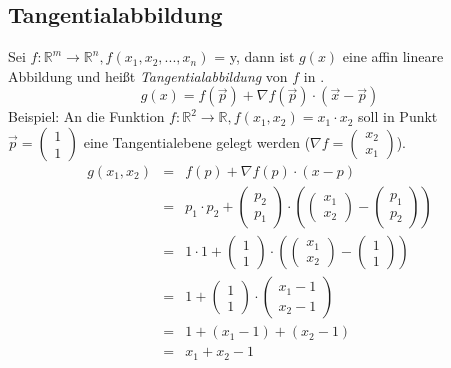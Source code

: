 \subsection{Tangentialabbildung} %
\label{sub:tangentialabbildung}
Sei $f : \mathbb{R}^m \rightarrow \mathbb{R}^n, f(x_1,x_2,...,x_n)$ = y, dann ist $g(x)$ eine affin lineare Abbildung und heißt
\emph{Tangentialabbildung} von $f$ in .
\begin{equation}
	g(x) = f(\overrightarrow{p}) + \nabla f(\overrightarrow{p})\cdot(\overrightarrow{x}-\overrightarrow{p})
\end{equation}
Beispiel: An die Funktion $f : \mathbb{R}^2 \rightarrow \mathbb{R}, f(x_1,x_2) = x_1 \cdot x_2$ soll in Punkt $\overrightarrow{p} = 
\left(\begin{array}{c}1\\1\end{array}\right)$ eine Tangentialebene gelegt werden 
($\nabla f = \left(\begin{array}{c}x_2\\x_1\end{array}\right)$). 
\begin{eqnarray*}
	g(x_1,x_2) &=& f(p) + \nabla f(p) \cdot (x-p) \\
	&=& p_1\cdot p_2 + \left(\begin{array}{c}p_2\\p_1\end{array}\right) \cdot
	 \left(\left(\begin{array}{c}x_1\\x_2\end{array}\right) - \left(\begin{array}{c}p_1\\p_2\end{array}\right) \right) \\
	&=& 1 \cdot 1 + \left(\begin{array}{c}1\\1\end{array}\right) \cdot \left(\left(\begin{array}{c}x_1\\x_2\end{array}\right)
	 - \left(\begin{array}{c}1\\1\end{array}\right) \right) \\
	&=& 1 + \left(\begin{array}{c}1\\1\end{array}\right) \cdot \left(\begin{array}{c}x_1 - 1\\x_2 - 1\end{array}\right) \\
	&=& 1+(x_1-1)+(x_2-1) \\
	&=& x_1 + x_2 -1
\end{eqnarray*}


